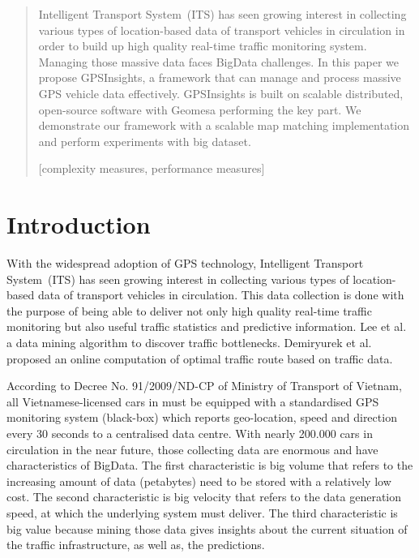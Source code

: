 \documentclass{acm_proc_article-sp}
\begin{document}
\maketitle
\begin{abstract}
Intelligent Transport System~(ITS) has seen growing interest in collecting various types of location-based data of transport vehicles in circulation in order to build up high quality real-time traffic monitoring system. Managing those massive data faces BigData challenges. In this paper we propose GPSInsights, a framework that can manage and process massive GPS vehicle data effectively. GPSInsights is built on scalable distributed, open-source software with Geomesa performing the key part.  We demonstrate our framework with a scalable map matching implementation and perform experiments with big dataset. 

[complexity measures, performance measures]


\end{abstract}

\section{Introduction}


With the widespread adoption of GPS technology, Intelligent Transport System~(ITS) has seen growing interest in collecting various types of location-based data of transport vehicles in circulation. This data collection is done with the purpose of being able to deliver not only high quality real-time traffic monitoring but also useful traffic statistics and predictive information. Lee et al.~\cite{Lee2011} a data mining algorithm to discover traffic bottlenecks. Demiryurek et al.~\cite{Demiryurek2010} proposed an online computation of optimal traffic route based on traffic data. 
	
According to Decree No. 91/2009/ND-CP of Ministry of Transport of Vietnam, all Vietnamese-licensed cars in must be equipped with a standardised GPS monitoring system (black-box) which reports geo-location, speed and direction every 30 seconds to a centralised data centre. With nearly 200.000 cars in circulation in the near future, those collecting data are enormous and have characteristics of BigData. The first characteristic is big volume that refers to the increasing amount of data (petabytes) need to be stored with a relatively low cost. The second characteristic is big velocity that refers to the data generation speed, at which the underlying system must deliver. The third characteristic is big value because mining those data gives insights about the current situation of the traffic infrastructure, as well as, the predictions. 
\end{document}
